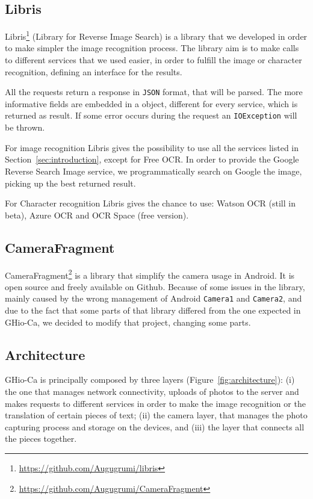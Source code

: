 \subsection{Libris}
Libris\footnote{\url{https://github.com/Augugrumi/libris}} (Library for Reverse
Image Search) is a library that we developed in order to make 
simpler the image recognition process. The library aim is to make calls to 
different services that we used easier, in order to fulfill the image or 
character recognition, defining an interface for the results.

All the requests return a response in \texttt{JSON} format, that will be parsed.
The more informative fields are embedded in a object, different for every
service, which is returned as result. If some error occurs during the request an
\texttt{IOException} will be thrown.

For image recognition Libris gives the possibility to use all the services
listed in Section~\ref{sec:introduction}, except for Free OCR. In order to
provide the Google Reverse Search Image service, we programmatically search on
Google the image, picking up the best returned result.

For Character recognition Libris gives the chance to use: Watson OCR (still in
beta), Azure OCR and OCR Space (free version).

\subsection{CameraFragment}
CameraFragment\footnote{\url{https://github.com/Augugrumi/CameraFragment}} is a
library that simplify the camera usage in Android. It is open source and freely 
available on Github. Because of some issues in the library, mainly caused by 
the wrong management of Android \texttt{Camera1} and \texttt{Camera2}, and due 
to the fact that some parts of that library differed from the one expected in 
GHio-Ca, we decided to modify that project, changing some parts.

\subsection{Architecture}
GHio-Ca is principally composed by three layers (Figure~\ref{fig:architecture}):
(i) the one that manages network connectivity, uploads of photos to the server
and makes requests to different services in order to make the image recognition
or the translation of certain pieces of text; (ii) the camera layer, that
manages the photo capturing process and storage on the devices, and (iii) the
layer that connects all the pieces together.

